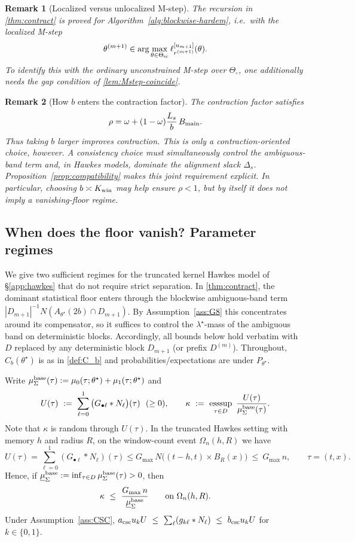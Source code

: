 \documentclass{statsoc}
\newtheorem{remark}[remark]{Remark}
\newcommand{\1}{\mathbbm{1}}
\begin{document}
\begin{remark}[Localized versus unlocalized M-step]\label{rem:localized-theorem}
The recursion in \cref{thm:contract} is proved for Algorithm~\ref{alg:blockwise-hardem}, i.e.\ with the localized M-step
\[
\theta^{(m+1)}\in \arg\max_{\theta\in\Theta_{\rm sc}}\ell_{r^{(m+1)}}^{[u_{m+1}]}(\theta).
\]
To identify this with the ordinary unconstrained M-step over \(\Theta_\circ\), one additionally needs the gap condition of \cref{lem:Mstep-coincide}.
\end{remark}

\begin{remark}[How \(b\) enters the contraction factor]\label{rem:rho-choice}
The contraction factor satisfies
\[
\rho=\omega+(1-\omega)\frac{L_s}{b}\,B_{\rm main}.
\]
Thus taking \(b\) larger improves contraction. This is only a contraction-oriented choice, however. A consistency choice must simultaneously control the ambiguous-band term and, in Hawkes models, dominate the alignment slack \(\Delta_s\). Proposition~\ref{prop:compatibility} makes this joint requirement explicit. In particular, choosing \(b\asymp K_{\rm win}\) may help ensure \(\rho<1\), but by itself it does not imply a vanishing-floor regime.
\end{remark}

\subsection{When does the floor vanish? Parameter regimes}\label{sec:param-regimes}

We give two sufficient regimes for the truncated kernel Hawkes model of \S\ref{app:hawkes} that do not require strict separation. In \cref{thm:contract}, the dominant statistical floor enters through the blockwise ambiguous-band term $|D_{m+1}|^{-1}N(A_{\theta^\star}(2b)\cap D_{m+1})$. By Assumption~\ref{ass:G8} this concentrates around its compensator, so it suffices to control the $\lambda^\star$-mass of the ambiguous band on deterministic blocks. Accordingly, all bounds below hold verbatim with $D$ replaced by any deterministic block $D_{m+1}$ (or prefix $D^{(m)}$). Throughout, $C_b(\theta^\star)$ is as in \cref{def:C_b} and probabilities/expectations are under $P_{\theta^\star}$.

Write $\mu_\Sigma^{\rm base}(\tau):=\mu_0(\tau;\theta^\star)+\mu_1(\tau;\theta^\star)$ and
\[
U(\tau)\ :=\ \sum_{\ell=0}^1\big(G_{\bullet\ell}*N_\ell\big)(\tau)\ \ (\ge 0),\qquad
\kappa\ :=\ \operatorname*{ess sup}_{\tau\in D}\ \frac{U(\tau)}{\mu_\Sigma^{\rm base}(\tau)}.
\]
Note that $\kappa$ is random through $U(\tau)$. In the truncated Hawkes setting with memory $h$ and radius $R$,
on the window-count event $\Omega_n(h,R)$ we have
\[
U(\tau)=\sum_{\ell=0}^1 (G_{\bullet\ell}*N_\ell)(\tau)
\le G_{\max}\,N\big((t-h,t)\times B_R(x)\big)\ \le\ G_{\max}\,n,
\qquad \tau=(t,x).
\]
Hence, if $\underline\mu^{\rm base}_\Sigma:=\inf_{\tau\in D}\mu_\Sigma^{\rm base}(\tau)>0$, then
\[
\kappa\ \le\ \frac{G_{\max}\,n}{\underline\mu^{\rm base}_\Sigma}\qquad\text{on }\Omega_n(h,R).
\]
Under Assumption~\ref{ass:CSC}, $a_{\rm csc}u_k U\ \le\ \sum_{\ell} (g_{k\ell}*N_\ell)\ \le\ b_{\rm csc}u_k U$ for $k\in\{0,1\}$.
\end{document}
